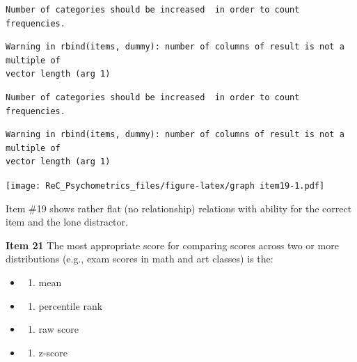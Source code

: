 \documentclass[
  english,
]{book}
\providecommand{\tightlist}{%
  \setlength{\itemsep}{0pt}\setlength{\parskip}{0pt}}
\begin{document}
\begin{verbatim}
Number of categories should be increased  in order to count frequencies. 
\end{verbatim}

\begin{verbatim}
Warning in rbind(items, dummy): number of columns of result is not a multiple of
vector length (arg 1)
\end{verbatim}

\begin{verbatim}
Number of categories should be increased  in order to count frequencies. 
\end{verbatim}

\begin{verbatim}
Warning in rbind(items, dummy): number of columns of result is not a multiple of
vector length (arg 1)
\end{verbatim}

\texttt{[image: ReC\_Psychometrics\_files/figure-latex/graph item19-1.pdf]}

Item \#19 shows rather flat (no relationship) relations with ability for the correct item and the lone distractor.

\textbf{Item 21} The most appropriate score for comparing scores across two or more distributions (e.g., exam scores in math and art classes) is the:

\begin{itemize}
\item
  \begin{enumerate}
  \def\labelenumi{\alph{enumi})}
  \tightlist
  \item
    mean
  \end{enumerate}
\item
  \begin{enumerate}
  \def\labelenumi{\alph{enumi})}
  \setcounter{enumi}{1}
  \tightlist
  \item
    percentile rank
  \end{enumerate}
\item
  \begin{enumerate}
  \def\labelenumi{\alph{enumi})}
  \setcounter{enumi}{2}
  \tightlist
  \item
    raw score
  \end{enumerate}
\item
  \begin{enumerate}
  \def\labelenumi{\alph{enumi})}
  \setcounter{enumi}{3}
  \tightlist
  \item
    z-score
  \end{enumerate}
\end{itemize}
\end{document}
